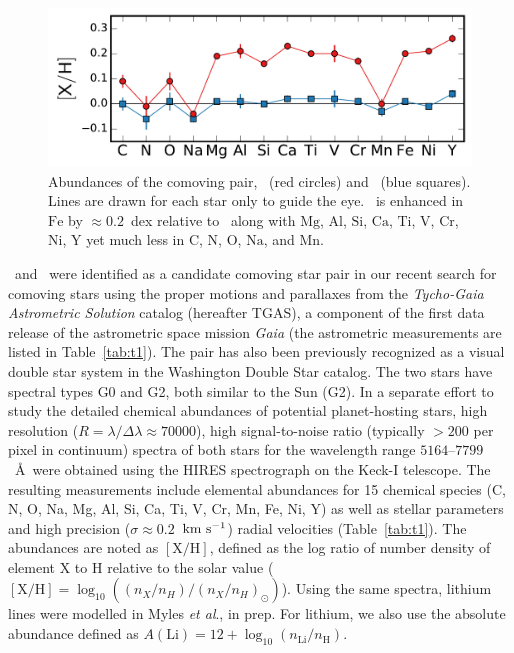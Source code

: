 \documentclass[12pt,letterpaper,margin=1in]{article}
\newcommand{\project}[1]{\textsl{#1}}
\newcommand{\acronym}[1]{{\small{#1}}}
\newcommand{\gaia}{\project{Gaia}}
\newcommand{\tgas}{\acronym{TGAS}}
\newcommand{\etal}{\textit{et al}.}
\newcommand*\elem[1]{\ensuremath{\mathrm{#1}}}
\newcommand*\elemH[1]{\ensuremath{[\mathrm{#1}/\elem{H}]}}
\newcommand{\sunanalog}{\text{Krios}}
\newcommand{\bizarreone}{\text{Kronos}}
\newcommand{\kms}{\ensuremath{\rm km~s^{-1}}}
\renewcommand\tablename{Table}
\begin{document}
\begin{figure}[htpb]
  \centering
  \includegraphics[width=0.9\linewidth]{abundances.pdf}
  \caption{Abundances of the comoving pair,
    \bizarreone\ (red circles) and \sunanalog\ (blue squares).
    Lines are drawn for each star only to guide the eye.
    \bizarreone\ is enhanced in \elem{Fe} by $\approx 0.2$~dex relative to
    \sunanalog\ along with \elem{Mg}, \elem{Al}, \elem{Si}, \elem{Ca},
    \elem{Ti}, \elem{V}, \elem{Cr}, \elem{Ni}, \elem{Y} yet much less in
    \elem{C}, \elem{N}, \elem{O}, \elem{Na}, and \elem{Mn}.
    \label{fig:abundances}
  }
\end{figure}


\sunanalog\ and \bizarreone\ were identified as a candidate comoving star pair
in our recent search\cite{2017AJ....153..257O} for comoving stars using the
proper motions and parallaxes from the {\it Tycho-Gaia Astrometric Solution}
catalog (hereafter \tgas), a component of the first data release of the
astrometric space mission \gaia\cite{2016A&A...595A...2G} (the astrometric
measurements are listed in \tablename~\ref{tab:t1}).
The pair has also been previously recognized as a visual double star system
in the Washington Double Star catalog\cite{2001AJ....122.3466M}.
The two stars have spectral types G0 and G2, both similar to the Sun (G2).
In a separate effort to study the detailed chemical abundances of potential
planet-hosting stars, high resolution ($R=\lambda/\Delta\lambda\approx 70000$),
high signal-to-noise ratio (typically $>200$ per pixel in continuum) spectra of
both stars for the wavelength range $5164$--$7799$~\AA\ were obtained using the
HIRES spectrograph on the Keck-I telescope\cite{2016ApJS..225...32B}.
The resulting measurements include elemental abundances for 15 chemical species
(C, N, O, Na, Mg, Al, Si, Ca, Ti, V, Cr, Mn, Fe, Ni, Y) as well as stellar
parameters and high precision ($\sigma\approx0.2$~\kms) radial velocities
(Table~\ref{tab:t1}).
The abundances are noted as \elemH{X}, defined as the log ratio of number
density of element \elem{X} to \elem{H} relative to the solar value
($\elemH{X} = \log_{10} ((n_X / n_H) / (n_X / n_H)_\odot)$).
Using the same spectra, lithium lines were modelled in Myles \etal, in prep.
For lithium, we also use the absolute abundance defined as $A(\elem{Li}) = 12 +
\log_{10} (n_\elem{Li}/n_\elem{H})$.
\end{document}
